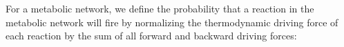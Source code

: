 For a metabolic network, we define the probability that a reaction in the metabolic network will fire by normalizing the thermodynamic driving force of each reaction by the sum of all forward and backward driving forces: